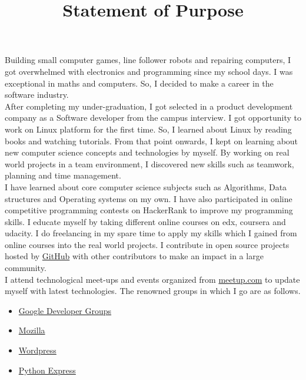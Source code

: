 \documentclass{article}
\title{Statement of Purpose}
\author{}
\begin{document}
  \maketitle %

Building small computer games, line follower robots and repairing computers, I got overwhelmed with electronics and programming since my school days. I was exceptional in maths and computers. So, I decided to make a career in the software industry.\\

After completing my under-graduation, I got selected in a product development company as a Software developer from the campus interview. I got opportunity to work on Linux platform for the first time. So, I learned about Linux by reading books and watching tutorials. From that point onwards, I kept on learning about new computer science concepts and technologies by myself. By working on real world projects in a team environment, I discovered new skills such as teamwork, planning and time management.\\

I have learned about core computer science subjects such as Algorithms, Data structures and Operating systems on my own. I have  also participated in online competitive programming contests on HackerRank to improve my programming skills. I educate myself by taking different online courses on edx, coursera and udacity. I do freelancing in my spare time to apply my skills which I gained from online courses into the real world projects. I contribute in open source projects hosted by \href{http://www.GitHub.com/mehul-m-prajapati}{GitHub} with other contributors to make an impact in a large community.\\

I attend technological meet-ups and events organized from \href{www.meetup.com}{meetup.com} to update myself with latest technologies. The renowned groups in which I go are as follows.

\begin{itemize}
   \item \href{https://developers.google.com/groups/chapter/106261089114347152720/}{Google Developer Groups}
   
   \item \href{http://mozillaindia.org/}{Mozilla} 
   
   \item \href{https://www.meetup.com/ahmedabad-wp-meetup/members/72560962/}{Wordpress}
   
   \item \href{https://pythonexpress.in/}{Python Express}
\end{itemize}
\end{document}
